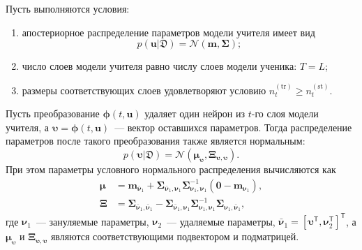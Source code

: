 \begin{theorem}\label{theorem:bayes-distill-neuron}
Пусть выполняются условия:
\begin{enumerate}[1)]
    \item апостериорное распределение параметров модели учителя имеет вид
    \[
        p(\mathbf{u}|\mathfrak{D})=\mathcal{N}(\mathbf{m},\boldsymbol{\Sigma});
    \]
    \item число слоев модели учителя равно числу слоев модели ученика: $T=L$;
    \item размеры соответствующих слоев удовлетворяют условию $n_t^{(\mathrm{tr})}\ge n_t^{(\mathrm{st})}$.
\end{enumerate}
Пусть преобразование $\boldsymbol{\phi}(t,\mathbf{u})$ удаляет один нейрон из $t$-го слоя модели учителя, а $\boldsymbol{\upsilon}=\boldsymbol{\phi}(t,\mathbf{u})$~--- вектор оставшихся параметров. Тогда распределение параметров после такого преобразования также является нормальным:
\[
    p(\boldsymbol{\upsilon}|\mathfrak{D})
    =
    \mathcal{N}(\boldsymbol{\mu}_{\boldsymbol{\upsilon}},
    \boldsymbol{\Xi}_{\boldsymbol{\upsilon},\boldsymbol{\upsilon}}).
\]
При этом параметры условного нормального распределения вычисляются как
\[
\begin{aligned}
    \boldsymbol{\mu}
    &=
    \mathbf{m}_{\bar{\boldsymbol{\nu}}_1}
    +
    \boldsymbol{\Sigma}_{\bar{\boldsymbol{\nu}}_1,\boldsymbol{\nu}_1}
    \boldsymbol{\Sigma}_{\boldsymbol{\nu}_1,\boldsymbol{\nu}_1}^{-1}
    (\mathbf{0}-\mathbf{m}_{\boldsymbol{\nu}_1}),\\
    \boldsymbol{\Xi}
    &=
    \boldsymbol{\Sigma}_{\bar{\boldsymbol{\nu}}_1,\bar{\boldsymbol{\nu}}_1}
    -
    \boldsymbol{\Sigma}_{\bar{\boldsymbol{\nu}}_1,\boldsymbol{\nu}_1}
    \boldsymbol{\Sigma}_{\boldsymbol{\nu}_1,\boldsymbol{\nu}_1}^{-1}
    \boldsymbol{\Sigma}_{\boldsymbol{\nu}_1,\bar{\boldsymbol{\nu}}_1},
\end{aligned}
\]
где $\boldsymbol{\nu}_1$~--- зануляемые параметры, $\boldsymbol{\nu}_2$~--- удаляемые параметры, $\bar{\boldsymbol{\nu}}_1=[\boldsymbol{\upsilon}^{\mathsf{T}},\boldsymbol{\nu}_2^{\mathsf{T}}]^{\mathsf{T}}$, а $\boldsymbol{\mu}_{\boldsymbol{\upsilon}}$ и $\boldsymbol{\Xi}_{\boldsymbol{\upsilon},\boldsymbol{\upsilon}}$ являются соответствующими подвектором и подматрицей.
\end{theorem}
